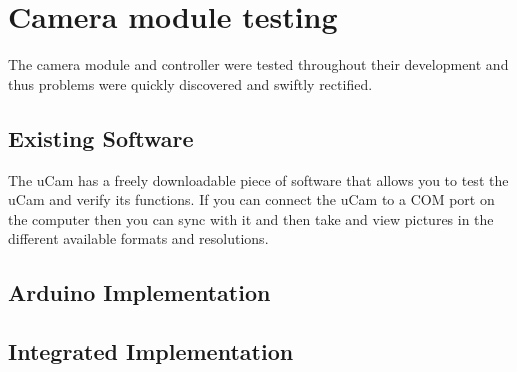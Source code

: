 \section{Camera module testing}

The camera module and controller were tested throughout their development and thus problems were quickly discovered and swiftly rectified.

\subsection{Existing Software}

The uCam has a freely downloadable piece of software that allows you to test the uCam and verify its functions. If you can connect the uCam to a COM port on the computer then you can sync with it and then take and view pictures in the different available formats and resolutions.

\subsection{Arduino Implementation}

\subsection{Integrated Implementation}

